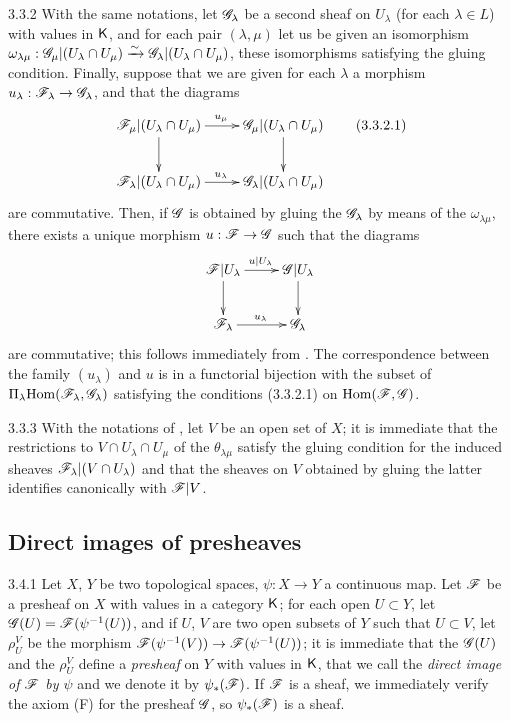 \begin{env}{3.3.2}
\label{env-0.3.3.2}
With the same notations, let $\mathscr{G}_\lambda$ be a second sheaf on $U_\lambda$
(for each $\lambda\in L$) with values in $\mathsf{K}$, and for each pair $(\lambda,\mu)$
let us be given an isomorphism
$\omega_{\lambda\mu}:\mathscr{G}_\mu|(U_\lambda\cap U_\mu)
  \xrightarrow{\sim}\mathscr{G}_\lambda|(U_\lambda\cap U_\mu)$, these isomorphisms satisfying the
gluing condition. Finally, suppose that we are given for each $\lambda$ a
morphism $u_\lambda:\mathscr{F}_\lambda\to\mathscr{G}_\lambda$, and that the diagrams
\[
  \xymatrix{
    \sh{F}_\mu|(U_\lambda\cap U_\mu)\ar[r]^{u_\mu}\ar[d] &
    \sh{G}_\mu|(U_\lambda\cap U_\mu)\ar[d]\\
    \sh{F}_\lambda|(U_\lambda\cap U_\mu)\ar[r]^{u_\lambda} &
    \sh{G}_\lambda|(U_\lambda\cap U_\mu)
  }
  \tag{3.3.2.1}
\]
are commutative. Then, if $\mathscr{G}$ is obtained by gluing the $\mathscr{G}_\lambda$ by
means of the $\omega_{\lambda\mu}$, there exists a unique morphism
$u:\mathscr{F}\to\mathscr{G}$ such that the diagrams
\[
  \xymatrix{
    \sh{F}|U_\lambda\ar[r]^{u|U_\lambda}\ar[d] &
    \sh{G}|U_\lambda\ar[d]\\
    \sh{F}_\lambda\ar[r]^{u_\lambda} &
    \sh{G}_\lambda
  }
\]
are commutative; this follows immediately from . The
correspondence between the family $(u_\lambda)$ and $u$ is in a functorial
bijection with the subset of $\Pi_\lambda{\mathop{\mathrm{Hom}}\nolimits}(\mathscr{F}_\lambda,\mathscr{G}_\lambda)$
satisfying the conditions (3.3.2.1) on ${\mathop{\mathrm{Hom}}\nolimits}(\mathscr{F},\mathscr{G})$.
\end{env}

\begin{env}{3.3.3}
\label{env-0.3.3.3}
With the notations of , let $V$ be an open set of $X$; it is
immediate that the restrictions to $V\cap U_\lambda\cap U_\mu$ of the
$\theta_{\lambda\mu}$ satisfy the gluing condition for the induced sheaves
$\mathscr{F}_\lambda|(V\cap U_\lambda)$ and that the sheaves on $V$ obtained by
gluing the latter identifies canonically with $\mathscr{F}|V$.
\end{env}

\subsection{Direct images of presheaves}
\label{0-prelim-3.4}

\begin{env}{3.4.1}
\label{env-0.3.4.1}
Let $X$, $Y$ be two topological spaces, $\psi:X\to Y$ a continuous map. Let
$\mathscr{F}$ be a presheaf on $X$ with values in a category $\mathsf{K}$; for each open
$U\subset Y$, let $\mathscr{G}(U)=\mathscr{F}(\psi^{-1}(U))$, and if $U$, $V$ are two open
subsets of $Y$ such that $U\subset V$, let $\rho_U^V$ be the morphism
$\mathscr{F}(\psi^{-1}(V))\to\mathscr{F}(\psi^{-1}(U))$; it is immediate that the
$\mathscr{G}(U)$ and the $\rho_U^V$ define a \emph{presheaf} on $Y$ with values in
$\mathsf{K}$, that we call the \emph{direct image of $\mathscr{F}$ by $\psi$} and we denote
it by $\psi_*(\mathscr{F})$. If $\mathscr{F}$ is a sheaf, we immediately verify the axiom
(F) for the presheaf $\mathscr{G}$, so $\psi_*(\mathscr{F})$ is a sheaf.
\end{env}

